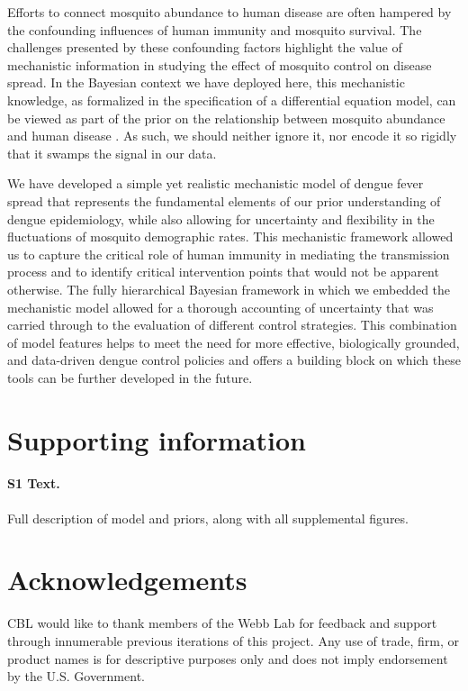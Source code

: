 \documentclass[10pt,letterpaper]{article}
\begin{document}
Efforts to connect mosquito abundance to human disease are often hampered by the confounding influences of human immunity and mosquito survival.
The challenges presented by these confounding factors highlight the value of mechanistic information in studying the effect of mosquito control on disease spread.
In the Bayesian context we have deployed here, this mechanistic knowledge, as formalized in the specification of a differential equation model, can be viewed as part of the prior on the relationship between mosquito abundance and human disease \cite{Ellner1998, Wikle2010}.
As such, we should neither ignore it, nor encode it so rigidly that it swamps the signal in our data.

We have developed a simple yet realistic mechanistic model of dengue fever spread that represents the fundamental elements of our prior understanding of dengue epidemiology, while also allowing for uncertainty and flexibility in the fluctuations of mosquito demographic rates.
This mechanistic framework allowed us to capture the critical role of human immunity in mediating the transmission process and to identify critical intervention points that would not be apparent otherwise.
The fully hierarchical Bayesian framework in which we embedded the mechanistic model allowed for a thorough accounting of uncertainty that was carried through to the evaluation of different control strategies.
This combination of model features helps to meet the need for more effective, biologically grounded, and data-driven dengue control policies and offers a building block on which these tools can be further developed in the future.

\section*{Supporting information}

\paragraph*{S1 Text.}
\label{S1}
{Full description of model and priors, along with all supplemental figures.}

\section*{Acknowledgements}

CBL would like to thank members of the Webb Lab for feedback and support through innumerable previous iterations of this project.
Any use of trade, firm, or product names is for descriptive purposes only and does not imply endorsement by the U.S. Government.
\end{document}
